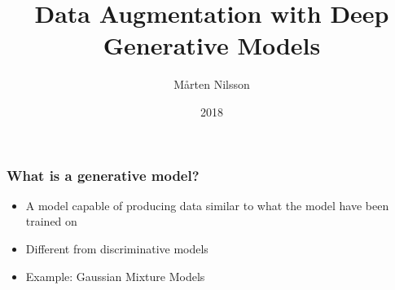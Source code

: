 \documentclass{beamer}
\title{Data Augmentation with Deep Generative Models}
\author{Mårten Nilsson}
\institute{Tobii}
\date{2018}
\begin{document}

\frame{\titlepage}

%
%
%
%
%
%



\begin{messageframe}
    \frametitle{What is a generative model?}

    \begin{itemize}
            \item A model capable of producing data similar to what the model have been trained on
            \item Different from discriminative models
            \item Example: Gaussian Mixture Models
    \end{itemize}

\end{messageframe}
\end{document}
